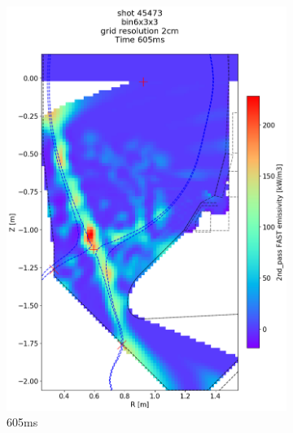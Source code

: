 \begin{figure}
\begin{subfigure}{0.395\linewidth}
         \includegraphics[trim={75 90 0 190},clip,width=\textwidth]{Chapters/chapter2/figs/IRVB-MASTU_shot-45473_export_74.png}
         \vspace*{-6.5mm}
         \caption{605ms}
         \label{fig:45473_export2_3}
     \end{subfigure}
     \begin{subfigure}{0.355\linewidth}
         \centering

\end{subfigure}
\end{figure}
